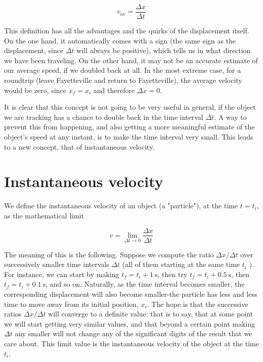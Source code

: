 \documentclass[10pt]{article}
\begin{document}
\begin{equation*}
v_{a v}=\frac{\Delta x}{\Delta t} \tag{1.6}
\end{equation*}


This definition has all the advantages and the quirks of the displacement itself. On the one hand, it automatically comes with a sign (the same sign as the displacement, since $\Delta t$ will always be positive), which tells us in what direction we have been traveling. On the other hand, it may not be an accurate estimate of our average speed, if we doubled back at all. In the most extreme case, for a roundtrip (leave Fayetteville and return to Fayetteville), the average velocity would be zero, since $x_{f}=x_{i}$ and therefore $\Delta x=0$.

It is clear that this concept is not going to be very useful in general, if the object we are tracking has a chance to double back in the time interval $\Delta t$. A way to prevent this from happening, and also getting a more meaningful estimate of the object's speed at any instant, is to make the time interval very small. This leads to a new concept, that of instantaneous velocity.

\section*{Instantaneous velocity}
We define the instantaneous velocity of an object (a "particle"), at the time $t=t_{i}$, as the mathematical limit


\begin{equation*}
v=\lim _{\Delta t \rightarrow 0} \frac{\Delta x}{\Delta t} \tag{1.7}
\end{equation*}


The meaning of this is the following. Suppose we compute the ratio $\Delta x / \Delta t$ over successively smaller time intervals $\Delta t$ (all of them starting at the same time $t_{i}$ ). For instance, we can start by making $t_{f}=t_{i}+1 \mathrm{~s}$, then try $t_{f}=t_{i}+0.5 \mathrm{~s}$, then $t_{f}=t_{i}+0.1 \mathrm{~s}$, and so on. Naturally, as the time interval becomes smaller, the corresponding displacement will also become smaller-the particle has less and less time to move away from its initial position, $x_{i}$. The hope is that the successive ratios $\Delta x / \Delta t$ will converge to a definite value: that is to say, that at some point we will start getting very similar values, and that beyond a certain point making $\Delta t$ any smaller will not change any of the significant digits of the result that we care about. This limit value is the instantaneous velocity of the object at the time $t_{i}$.
\end{document}
